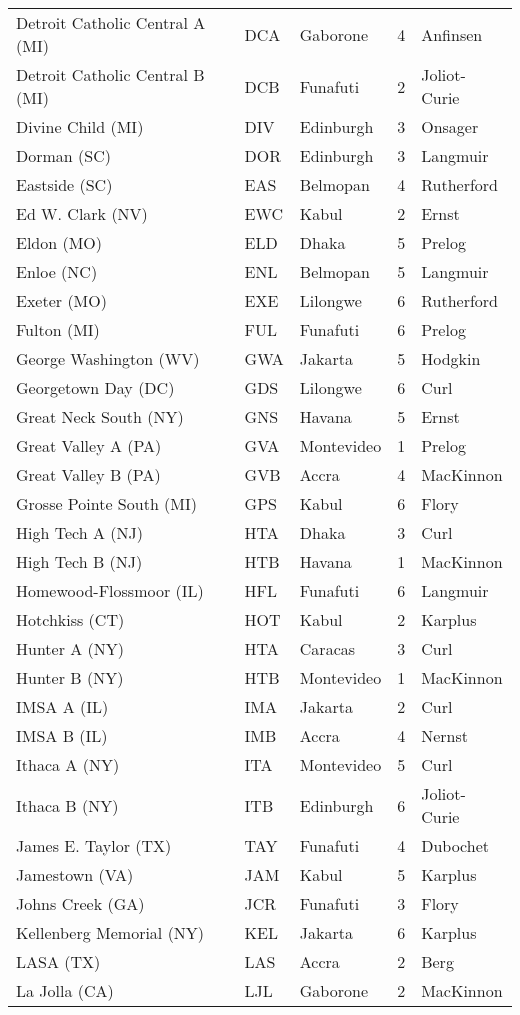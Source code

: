 \documentclass{article}%
\begin{document}
\begin{longtable}{|ll|lc|l|}
Detroit Catholic Central A (MI)&DCA&Gaborone&4&Anfinsen\\%
Detroit Catholic Central B (MI)&DCB&Funafuti&2&Joliot{-}Curie\\%
Divine Child (MI)&DIV&Edinburgh&3&Onsager\\%
Dorman (SC)&DOR&Edinburgh&3&Langmuir\\%
Eastside (SC)&EAS&Belmopan&4&Rutherford\\%
Ed W. Clark (NV)&EWC&Kabul&2&Ernst\\%
Eldon (MO)&ELD&Dhaka&5&Prelog\\%
Enloe (NC)&ENL&Belmopan&5&Langmuir\\%
Exeter (MO)&EXE&Lilongwe&6&Rutherford\\%
Fulton (MI)&FUL&Funafuti&6&Prelog\\%
George Washington (WV)&GWA&Jakarta&5&Hodgkin\\%
Georgetown Day (DC)&GDS&Lilongwe&6&Curl\\%
Great Neck South (NY)&GNS&Havana&5&Ernst\\%
Great Valley A (PA)&GVA&Montevideo&1&Prelog\\%
Great Valley B (PA)&GVB&Accra&4&MacKinnon\\%
Grosse Pointe South (MI)&GPS&Kabul&6&Flory\\%
High Tech A (NJ)&HTA&Dhaka&3&Curl\\%
High Tech B (NJ)&HTB&Havana&1&MacKinnon\\%
Homewood{-}Flossmoor (IL)&HFL&Funafuti&6&Langmuir\\%
Hotchkiss (CT)&HOT&Kabul&2&Karplus\\%
Hunter A (NY)&HTA&Caracas&3&Curl\\%
Hunter B (NY)&HTB&Montevideo&1&MacKinnon\\%
IMSA A (IL)&IMA&Jakarta&2&Curl\\%
IMSA B (IL)&IMB&Accra&4&Nernst\\%
Ithaca A (NY)&ITA&Montevideo&5&Curl\\%
Ithaca B (NY)&ITB&Edinburgh&6&Joliot{-}Curie\\%
James E. Taylor (TX)&TAY&Funafuti&4&Dubochet\\%
Jamestown (VA)&JAM&Kabul&5&Karplus\\%
Johns Creek (GA)&JCR&Funafuti&3&Flory\\%
Kellenberg Memorial (NY)&KEL&Jakarta&6&Karplus\\%
LASA (TX)&LAS&Accra&2&Berg\\%
La Jolla (CA)&LJL&Gaborone&2&MacKinnon\\%

\end{longtable}
\end{document}
